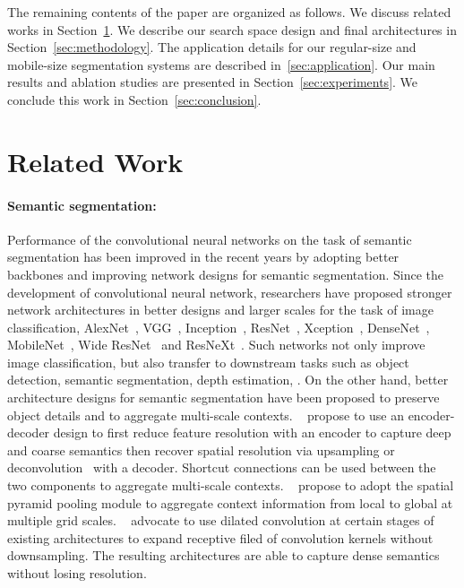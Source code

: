 \documentclass[10pt,twocolumn,letterpaper]{article}
\begin{document}
The remaining contents of the paper are organized as follows. We discuss related works in Section~\ref{sec:related_work}. We describe our search space design and final architectures in Section~\ref{sec:methodology}. The application details for our regular-size and mobile-size segmentation systems are described in~\ref{sec:application}. Our main results and ablation studies are presented in Section~\ref{sec:experiments}. We conclude this work in Section~\ref{sec:conclusion}.


\section{Related Work}\label{sec:related_work}
\paragraph{Semantic segmentation:} Performance of the convolutional neural networks on the task of semantic segmentation has been improved in the recent years by adopting better backbones and improving network designs for semantic segmentation. Since the development of convolutional neural network, researchers have proposed stronger network architectures in better designs and larger scales for the task of image classification, \eg AlexNet~\cite{alexnet}, VGG~\cite{vgg}, Inception~\cite{inceptionv1, inceptionv2, inceptionv3}, ResNet~\cite{resnet}, Xception~\cite{xception}, DenseNet~\cite{densenet}, MobileNet~\cite{mobilenetv2}, Wide ResNet~\cite{zagoruykoK16wideresnet} and ResNeXt~\cite{resnext}. Such networks not only improve image classification, but also transfer to downstream tasks such as object detection, semantic segmentation, depth estimation, \etc. On the other hand, better architecture designs for semantic segmentation have been proposed to preserve object details and to aggregate multi-scale contexts.
~\cite{Shelhamer2017FullyCN,deconvnet,Ronneberger2015UNetCN,Badrinarayanan2017SegNetAD,fpn,Zoph2020RethinkingPA} propose to use an encoder-decoder design to first reduce feature resolution with an encoder to capture deep and coarse semantics then recover spatial resolution via upsampling or deconvolution~\cite{deconv} with a decoder. Shortcut connections can be used between the two components to aggregate multi-scale contexts.
~\cite{deeplabv1,deeplabv3,deeplabv3plus,Zhao2017PyramidSP,He2015SpatialPP} propose to adopt the spatial pyramid pooling module to aggregate context information from local to global at multiple grid scales. 
~\cite{epitomic_conv,Yu2016MultiScaleCA,Chen2015SemanticIS,deeplabv1,deeplabv3,deeplabv3plus,Wu2016BridgingCA,scale-adaptive} advocate to use dilated convolution at certain stages of existing architectures to expand receptive filed of convolution kernels without downsampling. The resulting architectures are able to capture dense semantics without losing resolution.
\end{document}
